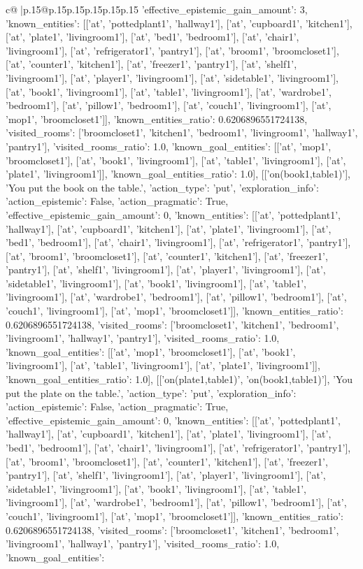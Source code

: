 \documentclass{article}
\begin{document}
{\begin{supertabular}{c@{$\;$}|p{.15\linewidth}@{}p{.15\linewidth}p{.15\linewidth}p{.15\linewidth}p{.15\linewidth}p{.15\linewidth}}
{{{'effective_epistemic_gain_amount': 3, 'known_entities': [['at', 'pottedplant1', 'hallway1'], ['at', 'cupboard1', 'kitchen1'], ['at', 'plate1', 'livingroom1'], ['at', 'bed1', 'bedroom1'], ['at', 'chair1', 'livingroom1'], ['at', 'refrigerator1', 'pantry1'], ['at', 'broom1', 'broomcloset1'], ['at', 'counter1', 'kitchen1'], ['at', 'freezer1', 'pantry1'], ['at', 'shelf1', 'livingroom1'], ['at', 'player1', 'livingroom1'], ['at', 'sidetable1', 'livingroom1'], ['at', 'book1', 'livingroom1'], ['at', 'table1', 'livingroom1'], ['at', 'wardrobe1', 'bedroom1'], ['at', 'pillow1', 'bedroom1'], ['at', 'couch1', 'livingroom1'], ['at', 'mop1', 'broomcloset1']], 'known_entities_ratio': 0.6206896551724138, 'visited_rooms': ['broomcloset1', 'kitchen1', 'bedroom1', 'livingroom1', 'hallway1', 'pantry1'], 'visited_rooms_ratio': 1.0, 'known_goal_entities': [['at', 'mop1', 'broomcloset1'], ['at', 'book1', 'livingroom1'], ['at', 'table1', 'livingroom1'], ['at', 'plate1', 'livingroom1']], 'known_goal_entities_ratio': 1.0}}], [['on(book1,table1)'], 'You put the book on the table.', {'action_type': 'put', 'exploration_info': {'action_epistemic': False, 'action_pragmatic': True, 'effective_epistemic_gain_amount': 0, 'known_entities': [['at', 'pottedplant1', 'hallway1'], ['at', 'cupboard1', 'kitchen1'], ['at', 'plate1', 'livingroom1'], ['at', 'bed1', 'bedroom1'], ['at', 'chair1', 'livingroom1'], ['at', 'refrigerator1', 'pantry1'], ['at', 'broom1', 'broomcloset1'], ['at', 'counter1', 'kitchen1'], ['at', 'freezer1', 'pantry1'], ['at', 'shelf1', 'livingroom1'], ['at', 'player1', 'livingroom1'], ['at', 'sidetable1', 'livingroom1'], ['at', 'book1', 'livingroom1'], ['at', 'table1', 'livingroom1'], ['at', 'wardrobe1', 'bedroom1'], ['at', 'pillow1', 'bedroom1'], ['at', 'couch1', 'livingroom1'], ['at', 'mop1', 'broomcloset1']], 'known_entities_ratio': 0.6206896551724138, 'visited_rooms': ['broomcloset1', 'kitchen1', 'bedroom1', 'livingroom1', 'hallway1', 'pantry1'], 'visited_rooms_ratio': 1.0, 'known_goal_entities': [['at', 'mop1', 'broomcloset1'], ['at', 'book1', 'livingroom1'], ['at', 'table1', 'livingroom1'], ['at', 'plate1', 'livingroom1']], 'known_goal_entities_ratio': 1.0}}], [['on(plate1,table1)', 'on(book1,table1)'], 'You put the plate on the table.', {'action_type': 'put', 'exploration_info': {'action_epistemic': False, 'action_pragmatic': True, 'effective_epistemic_gain_amount': 0, 'known_entities': [['at', 'pottedplant1', 'hallway1'], ['at', 'cupboard1', 'kitchen1'], ['at', 'plate1', 'livingroom1'], ['at', 'bed1', 'bedroom1'], ['at', 'chair1', 'livingroom1'], ['at', 'refrigerator1', 'pantry1'], ['at', 'broom1', 'broomcloset1'], ['at', 'counter1', 'kitchen1'], ['at', 'freezer1', 'pantry1'], ['at', 'shelf1', 'livingroom1'], ['at', 'player1', 'livingroom1'], ['at', 'sidetable1', 'livingroom1'], ['at', 'book1', 'livingroom1'], ['at', 'table1', 'livingroom1'], ['at', 'wardrobe1', 'bedroom1'], ['at', 'pillow1', 'bedroom1'], ['at', 'couch1', 'livingroom1'], ['at', 'mop1', 'broomcloset1']], 'known_entities_ratio': 0.6206896551724138, 'visited_rooms': ['broomcloset1', 'kitchen1', 'bedroom1', 'livingroom1', 'hallway1', 'pantry1'], 'visited_rooms_ratio': 1.0, 'known_goal_entities': }}}
\end{supertabular}}
\end{document}
